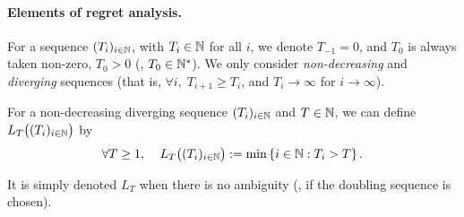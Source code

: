 \documentclass[12pt]{colt2018} %
\begin{document}
\paragraph{Elements of regret analysis.}
For a sequence $(T_i)_{i\in\mathbb{N}}$, with $T_i\in\mathbb{N}$ for all $i$, we denote $T_{-1} = 0$,
and $T_0$ is always taken non-zero, $T_0 > 0$ (\ie, $T_0\in\mathbb{N}^*$).
We only consider \emph{non-decreasing} and \emph{diverging} sequences
(that is, $\forall i,\; T_{i+1} \geq T_i$, and $T_i \to \infty$ for $i \to \infty$).



\begin{definition}\label{def:lastTerm}

    For a non-decreasing diverging sequence $(T_i)_{i\in\mathbb{N}}$
    and $T\in\mathbb{N}$,
    we can define $L_T\bigl((T_i)_{i\in\mathbb{N}}\bigr)$ by
    \begin{equation}
        \forall T\geq1,\;\;\;\;
        L_T\bigl((T_i)_{i\in\mathbb{N}}\bigr) := \min\left\{ i \in \mathbb{N} : T_i > T \right\}.
    \end{equation}

    It is simply denoted $L_T$ when there is no ambiguity (\eg, if the doubling sequence is chosen).
\end{definition}



\end{document}
